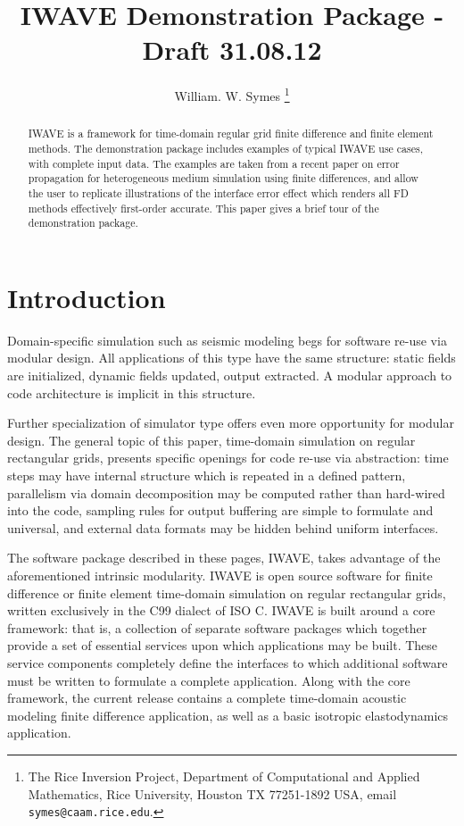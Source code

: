 \title{IWAVE Demonstration Package - Draft 31.08.12}
\author{William. W. Symes \thanks{The Rice Inversion Project,
Department of Computational and Applied Mathematics, Rice University,
Houston TX 77251-1892 USA, email {\tt symes@caam.rice.edu}.}}

\maketitle

\begin{abstract}
  IWAVE is a framework for time-domain regular grid finite difference
  and finite element methods. The demonstration package includes
  examples of typical IWAVE use cases, with complete input data. The
  examples are taken from a recent paper on error propagation for
  heterogeneous medium simulation using finite differences, and allow
  the user to replicate illustrations of the interface error effect
  which renders all FD methods effectively first-order accurate.  This
  paper gives a brief tour of the demonstration package.
\end{abstract}

\section{Introduction}
Domain-specific simulation such as seismic modeling begs for
software re-use via modular design. All applications of this type have
the same structure: static fields are initialized, dynamic fields
updated, output extracted. A modular approach to code architecture is
implicit in this structure.

Further specialization of simulator type offers even more opportunity
for modular design. The general topic of this paper, time-domain
simulation on regular rectangular grids, presents specific openings
for code re-use via abstraction: time steps may have internal
structure which is repeated in a defined pattern, parallelism via
domain decomposition may be computed rather than hard-wired into the
code, sampling rules for output buffering are simple to formulate and
universal, and external data formats may be hidden behind uniform
interfaces.

The software package described in these pages, IWAVE, takes advantage
of the aforementioned intrinsic modularity. IWAVE is open source
software for finite difference or finite element time-domain
simulation on regular rectangular grids, written exclusively in the
C99 dialect of ISO C. IWAVE is built around a core framework: that is,
a collection of separate software packages which together provide a
set of essential services upon which applications may be built. These
service components completely define the interfaces to which
additional software must be written to formulate a complete
application. Along with the core framework, the current release
contains a complete time-domain acoustic modeling finite difference
application, as well as a basic isotropic elastodynamics application.

